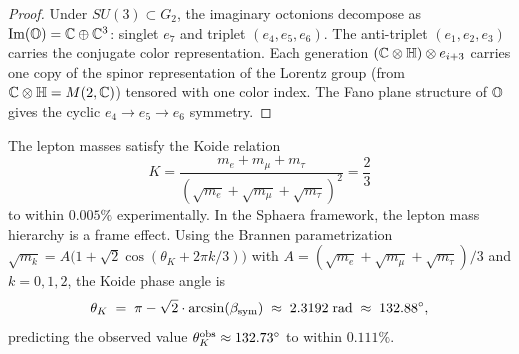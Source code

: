 \begin{proof}
Under $SU(3)\subset G_2$, the imaginary octonions decompose as
$\mathrm{Im}(\mathbb{O})=\mathbb{C}\oplus\mathbb{C}^3$: singlet $e_7$ and
triplet $(e_4,e_5,e_6)$.
The anti-triplet $(e_1,e_2,e_3)$ carries the conjugate color
representation.
Each generation $(\mathbb{C}\otimes\mathbb{H})\otimes e_{i+3}$ carries one
copy of the spinor representation of the Lorentz group (from
$\mathbb{C}\otimes\mathbb{H}=M(2,\mathbb{C})$) tensored with one color index.
The Fano plane structure of $\mathbb{O}$ gives the cyclic $e_4\to e_5\to e_6$
symmetry.
\end{proof}

\begin{theorem}
\label{thm:koide-triolic}
The lepton masses satisfy the Koide relation
\[
  K = \frac{m_e+m_\mu+m_\tau}{(\sqrt{m_e}+\sqrt{m_\mu}+\sqrt{m_\tau})^2}
    = \frac{2}{3}
\]
to within $0.005\%$ experimentally.
In the Sphaera framework, the lepton mass hierarchy is a frame effect.
Using the Brannen parametrization
$\sqrt{m_k} = A\bigl(1+\sqrt{2}\cos(\theta_K + 2\pi k/3)\bigr)$
with $A = (\sqrt{m_e}+\sqrt{m_\mu}+\sqrt{m_\tau})/3$
and $k=0,1,2$, the Koide phase angle is
\[
  \theta_K \;=\; \pi - \sqrt{2}\cdot\arcsin(\beta_{\mathrm{sym}}) \;\approx\; 2.3192\;\text{rad}
  \;\approx\; 132.88^\circ,
\]
predicting the observed value $\theta_K^{\rm obs}\approx 132.73^\circ$
to within $0.111\%$.
\end{theorem}

